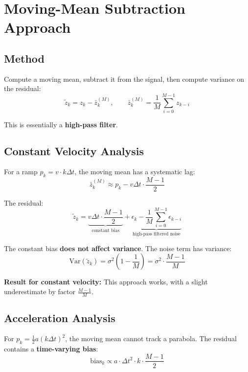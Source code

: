 \documentclass[11pt,a4paper]{article}
\begin{document}
\section{Moving-Mean Subtraction Approach}

\subsection{Method}

Compute a moving mean, subtract it from the signal, then compute variance on the residual:
\begin{equation}
    \tilde{z}_k = z_k - \bar{z}_k^{(M)}, \qquad \bar{z}_k^{(M)} = \frac{1}{M}\sum_{i=0}^{M-1} z_{k-i}
\end{equation}

This is essentially a \textbf{high-pass filter}.

\subsection{Constant Velocity Analysis}

For a ramp $p_k = v \cdot k\Delta t$, the moving mean has a systematic lag:
\begin{equation}
    \bar{z}_k^{(M)} \approx p_k - v\Delta t \cdot \frac{M-1}{2}
\end{equation}

The residual:
\begin{equation}
    \tilde{z}_k = \underbrace{v\Delta t \cdot \frac{M-1}{2}}_{\text{constant bias}} + \underbrace{\epsilon_k - \frac{1}{M}\sum_{i=0}^{M-1}\epsilon_{k-i}}_{\text{high-pass filtered noise}}
\end{equation}

The constant bias \textbf{does not affect variance}. The noise term has variance:
\begin{equation}
    \mathrm{Var}(\tilde{z}_k) = \sigma^2\left(1 - \frac{1}{M}\right) = \sigma^2 \cdot \frac{M-1}{M}
\end{equation}

\textbf{Result for constant velocity:} This approach works, with a slight underestimate by factor $\frac{M-1}{M}$.

\subsection{Acceleration Analysis}

For $p_k = \frac{1}{2}a(k\Delta t)^2$, the moving mean cannot track a parabola. The residual contains a \textbf{time-varying bias}:
\begin{equation}
    \text{bias}_k \propto a \cdot \Delta t^2 \cdot k \cdot \frac{M-1}{2}
\end{equation}
\end{document}
